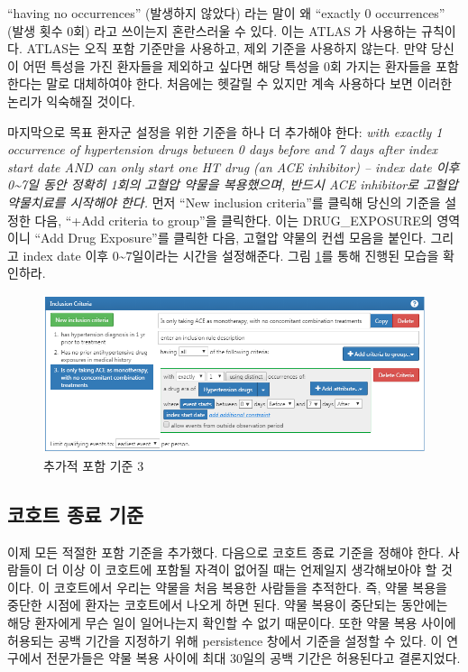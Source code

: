 \documentclass[11pt]{book}
\theoremstyle{definition}
\theoremstyle{definition}
\theoremstyle{definition}
\theoremstyle{remark}
\begin{document}
``having no occurrences'' (발생하지 않았다) 라는 말이 왜 ``exactly 0
occurrences'' (발생 횟수 0회) 라고 쓰이는지 혼란스러울 수 있다. 이는
ATLAS 가 사용하는 규칙이다. ATLAS는 오직 포함 기준만을 사용하고, 제외
기준을 사용하지 않는다. 만약 당신이 어떤 특성을 가진 환자들을 제외하고
싶다면 해당 특성을 0회 가지는 환자들을 포함한다는 말로 대체하여야 한다.
처음에는 헷갈릴 수 있지만 계속 사용하다 보면 이러한 논리가 익숙해질
것이다.

마지막으로 목표 환자군 설정을 위한 기준을 하나 더 추가해야 한다:
\emph{with exactly 1 occurrence of hypertension drugs between 0 days
before and 7 days after index start date AND can only start one HT drug
(an ACE inhibitor) -- index date 이후 0\textasciitilde{}7일 동안 정확히
1회의 고혈압 약물을 복용했으며, 반드시 ACE inhibitor로 고혈압 약물치료를
시작해야 한다.} 먼저 ``New inclusion criteria''를 클릭해 당신의 기준을
설정한 다음, ``+Add criteria to group''을 클릭한다. 이는
DRUG\_EXPOSURE의 영역이니 ``Add Drug Exposure''를 클릭한 다음, 고혈압
약물의 컨셉 모음을 붙인다. 그리고 index date 이후
0\textasciitilde{}7일이라는 시간을 설정해준다. 그림 \ref{fig:ATLASIC3}를
통해 진행된 모습을 확인하라.

\begin{figure}

{\centering \includegraphics[width=1\linewidth]{images/Cohorts/ATLAS-IC3} 

}

\caption{추가적 포함 기준 3}\label{fig:ATLASIC3}
\end{figure}

\subsection{코호트 종료 기준}\label{--}

이제 모든 적절한 포함 기준을 추가했다. 다음으로 코호트 종료 기준을
정해야 한다. 사람들이 더 이상 이 코호트에 포함될 자격이 없어질 때는
언제일지 생각해보아야 할 것이다. 이 코호트에서 우리는 약물을 처음 복용한
사람들을 추적한다. 즉, 약물 복용을 중단한 시점에 환자는 코호트에서
나오게 하면 된다. 약물 복용이 중단되는 동안에는 해당 환자에게 무슨 일이
일어나는지 확인할 수 없기 때문이다. 또한 약물 복용 사이에 허용되는 공백
기간을 지정하기 위해 persistence 창에서 기준을 설정할 수 있다. 이
연구에서 전문가들은 약물 복용 사이에 최대 30일의 공백 기간은 허용된다고
결론지었다.
\end{document}
